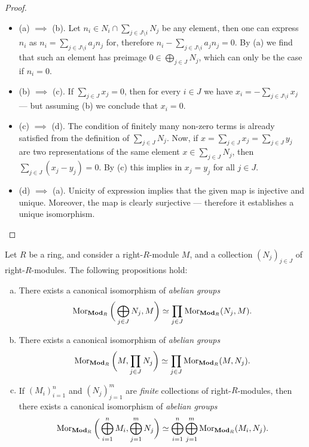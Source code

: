 \begin{proof}
\begin{itemize}\setlength\itemsep{0em}
\item (a) \(\implies\) (b). Let
  \(n_i \in N_i \cap \sum_{j \in J \setminus i} N_j\) be any element, then one
  can express \(n_i\) as \(n_i = \sum_{j \in J \setminus i} a_j  n_j\) for,
  therefore \(n_i - \sum_{j \in J \setminus i} a_j n_j = 0\). By (a) we find
  that such an element has preimage \(0 \in \bigoplus_{j \in J} N_j\), which can
  only be the case if \(n_i = 0\).

\item (b) \(\implies\) (c). If \(\sum_{j \in J} x_j = 0\), then for every \(i
  \in J\) we have \(x_i = - \sum_{j \in J \setminus i} x_j\) --- but assuming
  (b) we conclude that \(x_i = 0\).

\item (c) \(\implies\) (d). The condition of finitely many non-zero terms is
  already satisfied from the definition of \(\sum_{j \in J} N_j\). Now, if
  \(x = \sum_{j \in J} x_j = \sum_{j \in J} y_j\) are two representations of the
  same element \(x \in \sum_{j \in J} N_j\), then
  \(\sum_{j \in J}(x_j - y_j) = 0\). By (c) this implies in \(x_j = y_j\) for
  all \(j \in J\).

\item (d) \(\implies\) (a). Unicity of expression implies that the given map is
  injective and unique. Moreover, the map is clearly surjective --- therefore it
  establishes a unique isomorphism.
\end{itemize}
\end{proof}


\begin{proposition}
\label{prop:direct-sums-isos-hom-sets}
Let \(R\) be a ring, and consider a right-\(R\)-module \(M\), and a collection
\((N_j)_{j \in J}\) of right-\(R\)-modules. The following propositions hold:
\begin{enumerate}[(a)]\setlength\itemsep{0em}
\item There exists a canonical isomorphism of \emph{abelian groups}
  \[
  \operatorname{Mor}_{{\textbf{Mod}_{R}}}\bigg( \bigoplus_{j \in J} N_j, M \bigg) \simeq
  \prod_{j \in J} \operatorname{Mor}_{{\textbf{Mod}_{R}}}(N_j, M).
  \]

\item There exists a canonical isomorphism of \emph{abelian groups}
  \[
  \operatorname{Mor}_{{\textbf{Mod}_{R}}}\bigg( M, \prod_{j \in J} N_j \bigg) \simeq
  \prod_{j \in J} \operatorname{Mor}_{{\textbf{Mod}_{R}}}(M, N_j).
  \]
\item If \((M_i)_{i = 1}^n\) and \((N_j)_{j=1}^m\) are \emph{finite} collections
  of right-\(R\)-modules, then there exists a canonical isomorphism of
  \emph{abelian groups}
  \[
  \operatorname{Mor}_{{\textbf{Mod}_{R}}} \bigg( \bigoplus_{i=1}^n M_i, \bigoplus_{j=1}^m N_j \bigg)
  \simeq
  \bigoplus_{i=1}^n \bigoplus_{j=1}^m \operatorname{Mor}_{{\textbf{Mod}_{R}}}(M_i, N_j).
  \]
\end{enumerate}
\end{proposition}


